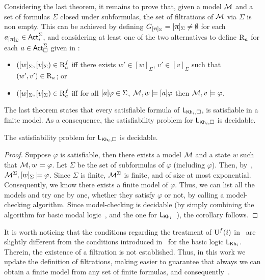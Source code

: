 Considering the last theorem, it remains to prove that, given a model $\mathcal{M}$ and a set of formulas $\Sigma$ closed under subformulas, the set of filtrations of $\mathcal{M}$ via $\Sigma$ is non empty.
This can be achieved by defining $G_{[\uppi]_\Sigma} = [\uppi]_\Sigma \neq \emptyset$ for each $a_{[\uppi]_\Sigma} \in {\rm \sf Act}^\Sigma_i$, and considering at least one of the two alternatives to define $\operatorname{R}_a$ for each $a \in {\rm \sf Act}^\Sigma_\square$ given in \cite{HML,mlbook}:

\begin{itemize}
\item $([w]_\Sigma,[v]_\Sigma) \in \operatorname{R}^f_a$ iff there exists $w' \in [w]_\Sigma$, $v' \in [v]_\Sigma$ such that $(w',v') \in \operatorname{R}_a$; or
\item $([w]_\Sigma,[v]_\Sigma) \in \operatorname{R}^f_a$ iff for all $[a]\varphi \in \Sigma$, $\mathcal{M},w \models [a]\varphi$ then $\mathcal{M},v \models \varphi$.
\end{itemize}
 
\medskip

The last theorem states that every satisfiable formula of $\mathsf{L}_{{\sf Kh}_i,\square}$, is satisfiable in a finite model.
As a consequence, the satisfiability problem for $\mathsf{L}_{{\sf Kh}_i,\square}$ is decidable.

\medskip

\begin{corollary}\label{cor:extended-decidable}
The satisfiability problem for $\mathsf{L}_{{\sf Kh}_i,\square}$ is decidable.
\end{corollary}

\begin{proof}
Suppose $\varphi$ is satisfiable, then there exists a model $\mathcal{M}$ and a state $w$ such that $\mathcal{M},w\models\varphi$. Let $\Sigma$ be the set of subformulas of $\varphi$ (including $\varphi$). Then, by~, $\mathcal{M}^\Sigma,[w]_\Sigma\models\varphi$. Since $\Sigma$ is finite, $\mathcal{M}^\Sigma$ is finite, and of size at most exponential. Consequently, we know there exists a finite model of $\varphi$. Thus, we can list all the models and try one by one, whether they satisfy $\varphi$ or not, by calling a model-checking algorithm. Since model-checking is decidable (by simply combining the algorithm for basic modal logic~\cite{mlbook}, and the one for $\mathsf{L}_{{\sf Kh}_i}$~\cite{AFSVQ21,AFSVQ23report}), the corollary follows. 
\end{proof}

\medskip

It is worth noticing that the conditions regarding the treatment of $\operatorname{U}^f(i)$ in~ are slightly different from the conditions introduced in~\cite{AFSVQ23report} for the basic logic $\mathsf{L}_{{\sf Kh}_i}$. Therein, the existence of a filtration is not established. Thus, in this work we update the definition of filtrations, making easier to guarantee that always we can obtain a finite model from any set of finite formulas, and consequently~.

